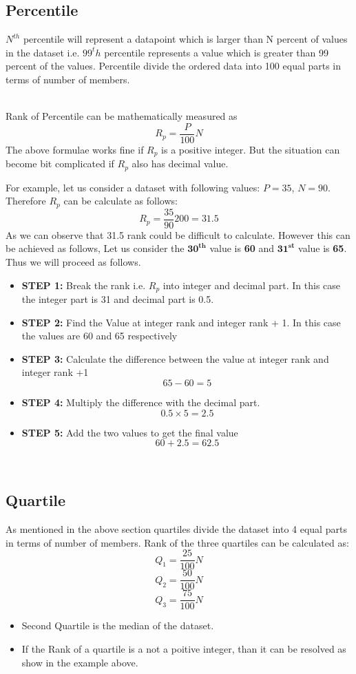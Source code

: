 \documentclass[twoside,12pt]{report}  %
\begin{document}
\subsection{Percentile}
\begin{tcolorbox}[colback=red!5!white, colframe=red!75!black, title = \textbf{Percentile}]
	$N^{th}$ percentile will represent a datapoint which is larger than N percent of values in the dataset i.e. $99^th$ percentile represents a value which is greater than 99 percent of the values. Percentile divide the ordered data into 100 equal parts in terms of number of members.
\end{tcolorbox}
\noindent
\\
Rank of Percentile can be mathematically measured as
$$ R_p = \frac{P}{100}N $$
\noindent
The above formulae works fine if $R_p$ is a positive integer. But the situation can become bit complicated if $R_p$ also has decimal value. 
\begin{tcolorbox}[colback=blue!5!white, colframe=blue!75!black, title = \textbf{Example}]
	For example, let us consider a dataset with following values:
	$P=35$, $N=90$. Therefore $R_p$ can be calculate as follows:
	$$R_p = \frac{35}{90}200 = 31.5$$
	As we can observe that 31.5 rank could be difficult to calculate. However this can be achieved as follows, Let us consider the $\boldsymbol{30^{th}}$ value is \textbf{60} and $\boldsymbol{31^{st}}$ value is \textbf{65}. Thus we will proceed as follows.
	\begin{itemize}
		\item \textbf{STEP 1:} Break the rank i.e. $R_p$ into integer and decimal part. In this case the integer part is 31 and decimal part is 0.5.
		\item \textbf{STEP 2:} Find the Value at integer rank and integer rank + 1. In this case the values are 60 and 65 respectively
		\item \textbf{STEP 3:} Calculate the difference between the value at integer rank and integer rank +1
		$$65 - 60 = 5$$ 
		\item \textbf{STEP 4:} Multiply the difference with the decimal part.
		$$ 0.5 \times  5 = 2.5$$
		\item \textbf{STEP 5:} Add the two values to get the final value
		$$ 60 + 2.5 = 62.5 $$
	\end{itemize}
\end{tcolorbox}
\noindent
\\
\subsection{Quartile}
As mentioned in the above section quartiles divide the dataset into 4 equal parts in terms of number of members. Rank of the three quartiles can be calculated as:
$$ Q_1 = \frac{25}{100}N $$
$$ Q_2 = \frac{50}{100}N $$
$$ Q_3 = \frac{75}{100}N $$
\begin{itemize}
	\item Second Quartile is the median of the dataset.
	\item If the Rank of a quartile is a not a poitive integer, than it can be resolved as show in the example above.
\end{itemize}
\end{document}
